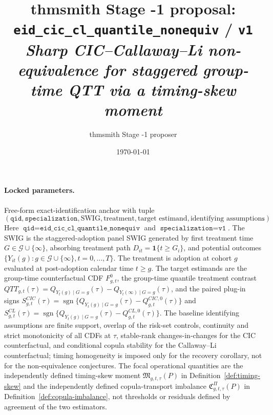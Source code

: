 \documentclass[11pt]{article}
\title{thmsmith Stage -1 proposal: \texttt{eid\_cic\_cl\_quantile\_nonequiv} / \texttt{v1}%
  \\ \large\textit{Sharp CIC--Callaway--Li non-equivalence for staggered group-time QTT via a timing-skew moment}}
\author{thmsmith Stage -1 proposer}
\date{\today}
\newcommand{\one}{\mathbf{1}}
\theoremstyle{definition}
\theoremstyle{plain}
\theoremstyle{remark}
\begin{document}
\maketitle


\paragraph{Locked parameters.}
Free-form exact-identification anchor with tuple
\[
(\texttt{qid},\texttt{specialization},\text{SWIG},\text{treatment},\text{target estimand},\text{identifying assumptions}).
\]
Here \(\texttt{qid}=\texttt{eid\_cic\_cl\_quantile\_nonequiv}\) and \(\texttt{specialization}=\texttt{v1}\). The SWIG is the staggered-adoption panel SWIG generated by first treatment time \(G\in\mathcal G\cup\{\infty\}\), absorbing treatment path \(D_{it}=\one\{t\geq G_i\}\), and potential outcomes \(\{Y_{it}(g):g\in\mathcal G\cup\{\infty\},t=0,\ldots,T\}\). The treatment is adoption at cohort \(g\) evaluated at post-adoption calendar time \(t\geq g\). The target estimands are the group-time counterfactual CDF \(F^0_{g,t}\), the group-time quantile treatment contrast \(QTT_{g,t}(\tau)=Q_{Y_t(g)\mid G=g}(\tau)-Q_{Y_t(\infty)\mid G=g}(\tau)\), and the paired plug-in signs \(S^{CIC}_{g,t}(\tau)=\operatorname{sgn}\{Q_{Y_t(g)\mid G=g}(\tau)-Q^{CIC,0}_{g,t}(\tau)\}\) and \(S^{CL}_{g,t}(\tau)=\operatorname{sgn}\{Q_{Y_t(g)\mid G=g}(\tau)-Q^{CL,0}_{g,t}(\tau)\}\). The baseline identifying assumptions are finite support, overlap of the risk-set controls, continuity and strict monotonicity of all CDFs at \(\tau\), stable-rank changes-in-changes for the CIC counterfactual, and conditional copula stability for the Callaway--Li counterfactual; timing homogeneity is imposed only for the recovery corollary, not for the non-equivalence conjectures. The focal operational quantities are the independently defined timing-skew moment \(\mathfrak M_{g,t,\tau}(P)\) in Definition~\ref{def:timing-skew} and the independently defined copula-transport imbalance \(\mathfrak C^{\Pi}_{g,t,\tau}(P)\) in Definition~\ref{def:copula-imbalance}, not thresholds or residuals defined by agreement of the two estimators.
\end{document}
